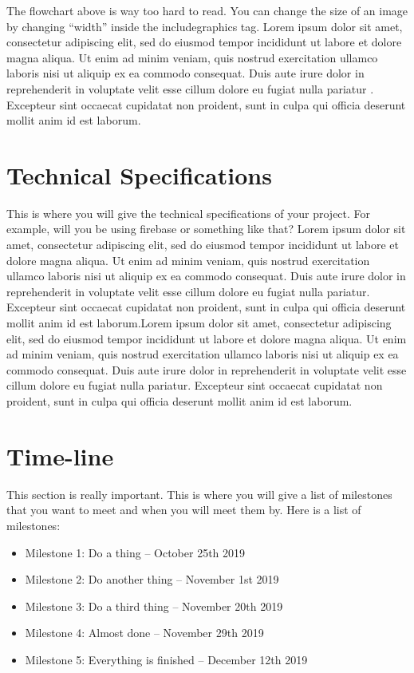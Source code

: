 \documentclass[12pt]{extarticle}
\begin{document}
The flowchart above is way too hard to read. You can change the size of an image by changing ``width'' inside the includegraphics tag. Lorem ipsum dolor sit amet, consectetur adipiscing elit, sed do eiusmod tempor incididunt ut labore et dolore magna aliqua. Ut enim ad minim veniam, quis nostrud exercitation ullamco laboris nisi ut aliquip ex ea commodo consequat. Duis aute irure dolor in reprehenderit in voluptate velit esse cillum dolore eu fugiat nulla pariatur \cite{higham1998handbook}. Excepteur sint occaecat cupidatat non proident, sunt in culpa qui officia deserunt mollit anim id est laborum.


\section{Technical Specifications}
This is where you will give the technical specifications of your project. For example, will you be using firebase or something like that? Lorem ipsum dolor sit amet, consectetur adipiscing elit, sed do eiusmod tempor incididunt ut labore et dolore magna aliqua. Ut enim ad minim veniam, quis nostrud exercitation ullamco laboris nisi ut aliquip ex ea commodo consequat. Duis aute irure dolor in reprehenderit in voluptate velit esse cillum dolore eu fugiat nulla pariatur. Excepteur sint occaecat cupidatat non proident, sunt in culpa qui officia deserunt mollit anim id est laborum.Lorem ipsum dolor sit amet, consectetur adipiscing elit, sed do eiusmod tempor incididunt ut labore et dolore magna aliqua. Ut enim ad minim veniam, quis nostrud exercitation ullamco laboris nisi ut aliquip ex ea commodo consequat. Duis aute irure dolor in reprehenderit in voluptate velit esse cillum dolore eu fugiat nulla pariatur. Excepteur sint occaecat cupidatat non proident, sunt in culpa qui officia deserunt mollit anim id est laborum.

\section{Time-line}
This section is really important. This is where you will give a list of milestones that you want to meet and when you will meet them by. Here is a list of milestones:
\begin{itemize}
	\item Milestone 1: Do a thing -- October 25th 2019
	\item Milestone 2: Do another thing -- November 1st 2019
	\item Milestone 3: Do a third thing -- November 20th 2019
	\item Milestone 4: Almost done -- November 29th 2019
    \item Milestone 5: Everything is finished -- December 12th 2019
\end{itemize}
\end{document}
